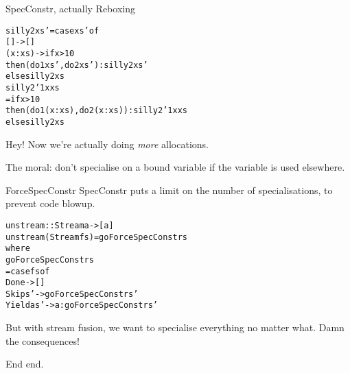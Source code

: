 \documentclass[t]{beamer}
\newcommand{\oomph}[1]{\textcolor[rgb]{0.0,0.5,0.9}{#1}}
\begin{document}
\begin{frame}[fragile]{SpecConstr, actually}
Reboxing

\begin{alltt}
silly2 xs' = case xs' of
 []     -> []
 (x:xs) -> if   x > 10
           then (do1    xs', do2    xs') : silly2    xs'
           else silly2 xs
silly2'1 x xs
 =         if   x > 10
           then (do1 \oomph{(x:xs)}, do2 \oomph{(x:xs)}) : \oomph{silly2'1 x xs}
           else silly2 xs
\end{alltt}

Hey! Now we're actually doing \emph{more} allocations.

The moral: don't specialise on a bound variable if the variable is used elsewhere. 
\end{frame}


\begin{frame}[fragile]{ForceSpecConstr}
SpecConstr puts a limit on the number of specialisations,
to prevent code blowup.
\begin{alltt}
unstream :: Stream a -> [a]
unstream (Stream f s) = go \oomph{ForceSpecConstr} s
 where
  go \oomph{ForceSpecConstr} s
   = case f s of
     Done       -> []
     Skip    s' ->     go \oomph{ForceSpecConstr} s'
     Yield a s' -> a : go \oomph{ForceSpecConstr} s'
\end{alltt}

But with stream fusion, we want to specialise everything no matter what.
Damn the consequences!
\end{frame}




\begin{frame}[fragile]{End}
end.
\end{frame}
\end{document}
